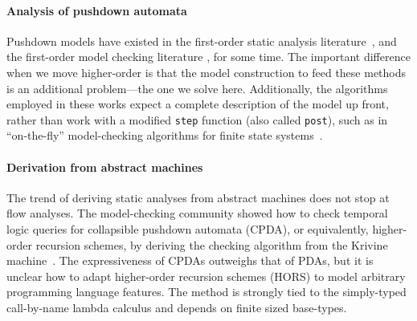 \paragraph{Analysis of pushdown automata}
Pushdown models have existed in the first-order static analysis literature~\citep[Chapter 7]{local:muchnick:jones:flow-analysis:1981}\citep{ianjohnson:reps:pushdown:1995}, and the first-order model checking literature \citep{ianjohnson:bouajiani:esparza:pushdown:1997}, for some time.
%
The important difference when we move higher-order is that the model construction to feed these methods is an additional problem---the one we solve here.
%
Additionally, the algorithms employed in these works expect a complete description of the model up front, rather than work with a modified \texttt{step} function (also called \texttt{post}), such as in ``on-the-fly'' model-checking algorithms for finite state systems~\citep{DBLP:conf/tacas/SchwoonE05}.

\paragraph{Derivation from abstract machines}
The trend of deriving static analyses from abstract machines does not stop at flow analyses.
%
The model-checking community showed how to check temporal logic queries for collapsible pushdown automata (CPDA), or equivalently, higher-order recursion schemes, by deriving the checking algorithm from the Krivine machine~\citep{ianjohnson:Salvati:2011:KMH:2027223.2027239}.
%
The expressiveness of CPDAs outweighs that of PDAs, but it is unclear how to adapt higher-order recursion schemes (HORS) to model arbitrary programming language features.
%
The method is strongly tied to the simply-typed call-by-name lambda calculus and depends on finite sized base-types.
%
